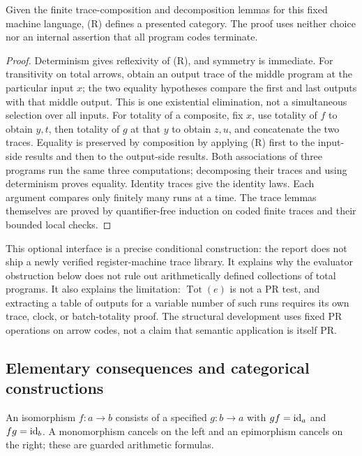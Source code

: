 \begin{proposition}
Given the finite trace-composition and decomposition lemmas for this fixed
machine language, (R) defines a presented category. The proof uses neither
choice nor an internal assertion that all program codes terminate.
\end{proposition}
\begin{proof}
Determinism gives reflexivity of (R), and symmetry is immediate. For
transitivity on total arrows, obtain an output trace of the middle program
at the particular input $x$; the two equality hypotheses compare the first
and last outputs with that middle output. This is one existential
elimination, not a simultaneous selection over all inputs.
For totality of a composite, fix $x$, use totality of $f$ to obtain $y,t$,
then totality of $g$ at that $y$ to obtain $z,u$, and concatenate the two
traces. Equality is preserved by composition by applying (R) first to
the input-side results and then to the output-side results. Both
associations of three programs run the same three computations; decomposing
their traces and using determinism proves equality. Identity traces give
the identity laws. Each argument compares only finitely many runs at a
time. The trace lemmas themselves are proved by quantifier-free induction
on coded finite traces and their bounded local checks.
\end{proof}

This optional interface is a precise conditional construction: the report
does not ship a newly verified register-machine trace library. It explains
why the evaluator obstruction below does not rule out arithmetically
defined collections of total programs. It also explains the limitation:
$\operatorname{Tot}(e)$ is not a PR test, and extracting a table of outputs
for a variable number of such runs requires its own trace, clock, or
batch-totality proof. The structural development uses fixed PR operations
on arrow codes, not a claim that semantic application is itself PR.

\subsection{Elementary consequences and categorical constructions}
An isomorphism $f:a\to b$ consists of a specified $g:b\to a$ with
$gf=\operatorname{id}_a$ and $fg=\operatorname{id}_b$. A monomorphism cancels on the left and an
epimorphism cancels on the right; these are guarded arithmetic formulas.

